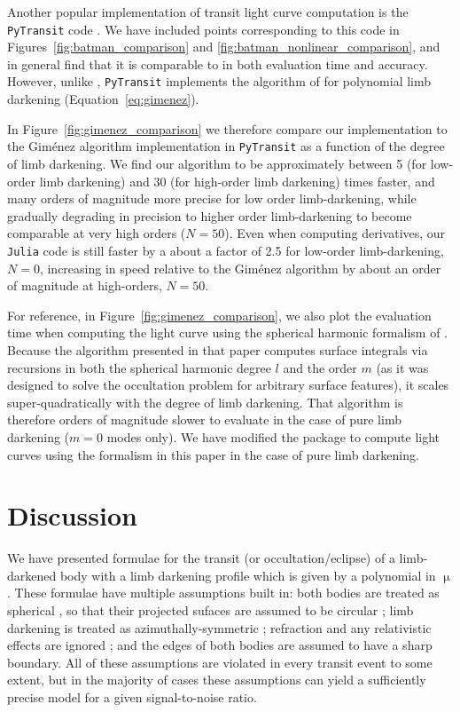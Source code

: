 \documentclass[modern,trackchanges]{aastex63}
\newcommand{\edited}{}
\begin{document}
Another popular implementation of transit light curve computation is the
\texttt{PyTransit} code \citep{Parviainen2015b}. We {\edited have} included points corresponding
to this code in Figures~\ref{fig:batman_comparison} and \ref{fig:batman_nonlinear_comparison},
and in general find that it is comparable to \batman in both evaluation time
and accuracy. However, unlike \batman, \texttt{PyTransit} implements the
algorithm of \citet{Gimenez2006} for polynomial limb darkening (Equation~\ref{eq:gimenez}).

In Figure~\ref{fig:gimenez_comparison} we therefore compare our implementation
to {\edited the Gim\'enez algorithm implementation} in \texttt{PyTransit} as a function 
of the degree of limb darkening.
We find our algorithm to be approximately between 5 (for low-order limb darkening)
and 30 (for high-order limb darkening) times faster, and many orders of magnitude
more precise {\edited for low order limb-darkening, while gradually degrading in precision
to higher order limb-darkening to become comparable at very high orders ($N=50$)}. 
{\edited Even when computing derivatives, our \texttt{Julia} code is still faster by
a about a factor of 2.5 for low-order limb-darkening, $N=0$, increasing in
speed relative to the Gim\'enez algorithm by about an order of magnitude at high-orders,
$N=50$}.

For reference, in Figure~\ref{fig:gimenez_comparison},
we also plot the evaluation time when computing the light curve using the
spherical harmonic formalism of \cite{starry}. Because the algorithm presented
in that paper computes surface integrals via recursions in both the
spherical harmonic degree $l$ and the order $m$ (as it was designed to
solve the occultation problem for arbitrary surface features),
it scales super-quadratically with the degree of limb darkening. That
algorithm is therefore orders of magnitude slower
to evaluate in the case of pure limb darkening ($m=0$ modes only). We have
modified the \starry package to compute light curves
using the formalism in this paper in the case of pure limb darkening.

\section{Discussion}
\label{sec:discussion}

We have presented formulae for the transit (or occultation/eclipse) of a
limb-darkened body with a limb darkening profile which is given by a polynomial
in $\upmu$.  These formulae have multiple assumptions built in:  both bodies
are treated as spherical \citep[but see][]{Seager2002,Hui2002}, so that their projected
sufaces are assumed to be circular \citep[but see][]{Barnes2003,Barnes2004,Barnes2009b,
DobbsDixon2012};  limb darkening is treated as azimuthally-symmetric \citep[but see][]{Barnes2009a};
refraction and any relativistic effects are ignored \citep[but see][]{Sidis2010};
and the edges of both bodies are assumed to have a sharp boundary.
All of these assumptions are violated in every transit event to some extent,
but in the majority of cases these assumptions can yield a sufficiently precise model for
a given signal-to-noise ratio.
\end{document}

